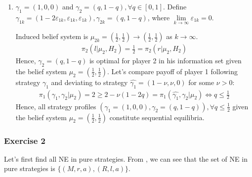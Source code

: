 \documentclass[]{article}
\begin{document}
\begin{enumerate}
	\item $\gamma_1 = (1, 0, 0)$ and $\gamma_2 = (q, 1 - q), \forall q\in[0, 1]$. Define $\gamma_{1k} = (1 - 2\varepsilon_{1k}, \varepsilon_{1k}, \varepsilon_{1k}), \gamma_{2k} = (q, 1 - q)$, where $\lim\limits_{k\to\infty}\varepsilon_{1k} = 0$.
	
	Induced belief system is $\mu_{2k} = (\frac{1}{2}, \frac{1}{2}) \to (\frac{1}{2}, \frac{1}{2})$ as $k\to\infty$.
	\begin{equation}
		\begin{split}
			\pi_2(l|\mu_2, H_2) = \frac{1}{2} = \pi_2(r|\mu_2, H_2) \nonumber
		\end{split}
	\end{equation}
	Hence, $\gamma_2 = (q, 1 - q)$ is optimal for player 2 in his information set given the belief system $\mu_2 = (\frac{1}{2}, \frac{1}{2})$. Let's compare payoff of player 1 following strategy $\gamma_1$ and deviating to strategy $\hat{\gamma_1} = (1 - \nu, \nu, 0)$ for some $\nu > 0$:
	\begin{equation}
		\begin{split}
			\pi_1(\gamma_1, \gamma_2|\mu_2) = 2 \geq 2 - \nu(1 - 2q) = \pi_1(\hat{\gamma_1}, \gamma_2|\mu_2) \iff q \leq\frac{1}{2} \nonumber
		\end{split}
	\end{equation}
	Hence, all strategy profiles $(\gamma_1 = (1, 0, 0), \gamma_2 = (q, 1 - q)), \forall q\leq\frac{1}{2}$ given the belief system $\mu_2 = (\frac{1}{2}, \frac{1}{2})$ constitute sequential equilibria.
\end{enumerate}

\subsubsection*{Exercise 2}

Let's first find all NE in pure strategies. From , we can see that the set of NE in pure strategies is $\{(M, r, a), (R, l, a)\}$.
\end{document}
